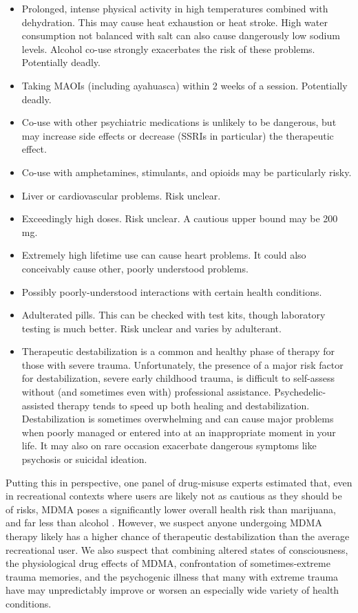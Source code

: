 \documentclass[12pt,letterpaper]{book}
\begin{document}
\begin{itemize}
    \item Prolonged, intense physical activity in high temperatures combined with dehydration. This may cause heat exhaustion or heat stroke. High water consumption not balanced with salt can also cause dangerously low sodium levels. Alcohol co-use strongly exacerbates the risk of these problems. Potentially deadly.
    \item Taking MAOIs (including ayahuasca) within 2 weeks of a session. Potentially deadly.
    \item Co-use with other psychiatric medications is unlikely to be dangerous, but may increase side effects or decrease (SSRIs in particular) the therapeutic effect.
    \item Co-use with amphetamines, stimulants, and opioids may be particularly risky.
    \item Liver or cardiovascular problems. Risk unclear.
    \item Exceedingly high doses. Risk unclear. A cautious upper bound may be 200 mg.
    \item Extremely high lifetime use can cause heart problems. It could also conceivably cause other, poorly understood problems.
    \item Possibly poorly-understood interactions with certain health conditions.
    \item Adulterated pills. This can be checked with test kits, though laboratory testing is much better. Risk unclear and varies by adulterant.
    \item Therapeutic destabilization is a common and healthy phase of therapy for those with severe trauma. Unfortunately, the presence of a major risk factor for destabilization, severe early childhood trauma, is difficult to self-assess without (and sometimes even with) professional assistance. Psychedelic-assisted therapy tends to speed up both healing and destabilization. Destabilization is sometimes overwhelming and can cause major problems when poorly managed or entered into at an inappropriate moment in your life. It may also on rare occasion exacerbate dangerous symptoms like psychosis or suicidal ideation.
\end{itemize}
Putting this in perspective, one panel of drug-misuse experts estimated that, even in recreational contexts where users are likely not as cautious as they should be of risks, MDMA poses a significantly lower overall health risk than marijuana, and far less than alcohol \cite{nuttDrugHarms}. However, we suspect anyone undergoing MDMA therapy likely has a higher chance of therapeutic destabilization than the average recreational user. We also suspect that combining altered states of consciousness, the physiological drug effects of MDMA, confrontation of sometimes-extreme trauma memories, and the psychogenic illness that many with extreme trauma have may unpredictably improve or worsen an especially wide variety of health conditions.
\end{document}
